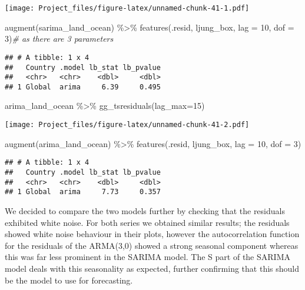\documentclass[
]{article}
\newenvironment{Shaded}{\begin{snugshade}}{\end{snugshade}}
\newcommand{\AttributeTok}[1]{\textcolor[rgb]{0.77,0.63,0.00}{#1}}
\newcommand{\CommentTok}[1]{\textcolor[rgb]{0.56,0.35,0.01}{\textit{#1}}}
\newcommand{\DecValTok}[1]{\textcolor[rgb]{0.00,0.00,0.81}{#1}}
\newcommand{\FunctionTok}[1]{\textcolor[rgb]{0.00,0.00,0.00}{#1}}
\newcommand{\NormalTok}[1]{#1}
\newcommand{\SpecialCharTok}[1]{\textcolor[rgb]{0.00,0.00,0.00}{#1}}
\begin{document}
\texttt{[image: Project\_files/figure-latex/unnamed-chunk-41-1.pdf]}

\begin{Shaded}
\begin{Highlighting}[]
\FunctionTok{augment}\NormalTok{(sarima\_land\_ocean) }\SpecialCharTok{\%\textgreater{}\%}
  \FunctionTok{features}\NormalTok{(.resid, ljung\_box, }\AttributeTok{lag =} \DecValTok{10}\NormalTok{, }\AttributeTok{dof =} \DecValTok{3}\NormalTok{)}\CommentTok{\# as there are 3 parameters}
\end{Highlighting}
\end{Shaded}

\begin{verbatim}
## # A tibble: 1 x 4
##   Country .model lb_stat lb_pvalue
##   <chr>   <chr>    <dbl>     <dbl>
## 1 Global  arima     6.39     0.495
\end{verbatim}

\begin{Shaded}
\begin{Highlighting}[]
\NormalTok{arima\_land\_ocean }\SpecialCharTok{\%\textgreater{}\%} \FunctionTok{gg\_tsresiduals}\NormalTok{(}\AttributeTok{lag\_max=}\DecValTok{15}\NormalTok{)}
\end{Highlighting}
\end{Shaded}

\texttt{[image: Project\_files/figure-latex/unnamed-chunk-41-2.pdf]}

\begin{Shaded}
\begin{Highlighting}[]
\FunctionTok{augment}\NormalTok{(arima\_land\_ocean) }\SpecialCharTok{\%\textgreater{}\%}
  \FunctionTok{features}\NormalTok{(.resid, ljung\_box, }\AttributeTok{lag =} \DecValTok{10}\NormalTok{, }\AttributeTok{dof =} \DecValTok{3}\NormalTok{)}
\end{Highlighting}
\end{Shaded}

\begin{verbatim}
## # A tibble: 1 x 4
##   Country .model lb_stat lb_pvalue
##   <chr>   <chr>    <dbl>     <dbl>
## 1 Global  arima     7.73     0.357
\end{verbatim}

We decided to compare the two models further by checking that the
residuals exhibited white noise. For both series we obtained similar
results; the residuals showed white noise behaviour in their plots,
however the autocorrelation function for the residuals of the ARMA(3,0)
showed a strong seasonal component whereas this was far less prominent
in the SARIMA model. The S part of the SARIMA model deals with this
seasonality as expected, further confirming that this should be the
model to use for forecasting.
\end{document}
